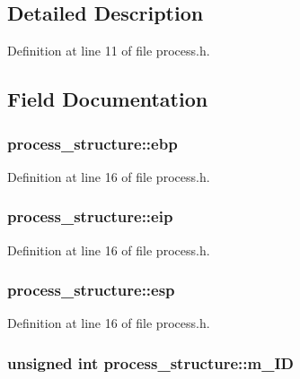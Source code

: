 \subsection{Detailed Description}


Definition at line 11 of file process.h.



\subsection{Field Documentation}
\hypertarget{structprocess__structure_a3fd20d68dc26771c688e272d96d44145}{
\subsubsection[{ebp}]{ {\bf process\_\-structure::ebp}}}
\label{structprocess__structure_a3fd20d68dc26771c688e272d96d44145}


Definition at line 16 of file process.h.

\hypertarget{structprocess__structure_a4267ae7974329fbe4e73475912fc2086}{
\subsubsection[{eip}]{ {\bf process\_\-structure::eip}}}
\label{structprocess__structure_a4267ae7974329fbe4e73475912fc2086}


Definition at line 16 of file process.h.

\hypertarget{structprocess__structure_ab11061d99fc788d301f8a6602df30a07}{
\subsubsection[{esp}]{ {\bf process\_\-structure::esp}}}
\label{structprocess__structure_ab11061d99fc788d301f8a6602df30a07}


Definition at line 16 of file process.h.

\hypertarget{structprocess__structure_a224ebd60629fb6a835735e891c5ed665}{
\subsubsection[{m\_\-ID}]{\setlength{\rightskip}{0pt plus 5cm}unsigned int {\bf process\_\-structure::m\_\-ID}}}
\label{structprocess__structure_a224ebd60629fb6a835735e891c5ed665}


